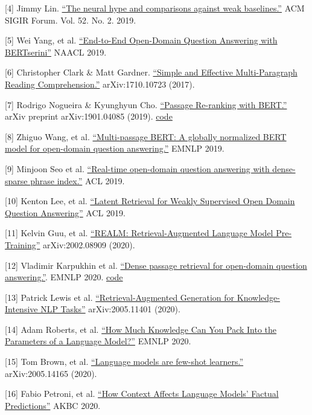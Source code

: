 {[}4{]} Jimmy Lin. \href{https://sigir.org/wp-content/uploads/2019/01/p040.pdf}{``The neural hype and comparisons against weak baselines.''} ACM SIGIR Forum. Vol. 52. No. 2. 2019.

{[}5{]} Wei Yang, et al. \href{https://arxiv.org/abs/1902.01718}{``End-to-End Open-Domain Question Answering with BERTserini''} NAACL 2019.

{[}6{]} Christopher Clark \& Matt Gardner. \href{https://arxiv.org/abs/1710.10723}{``Simple and Effective Multi-Paragraph Reading Comprehension.''} arXiv:1710.10723 (2017).

{[}7{]} Rodrigo Nogueira \& Kyunghyun Cho. \href{https://arxiv.org/abs/1901.04085}{``Passage Re-ranking with BERT.''} arXiv preprint arXiv:1901.04085 (2019). \textbar{} \href{https://github.com/nyu-dl/dl4marco-bert}{code}

{[}8{]} Zhiguo Wang, et al. \href{https://arxiv.org/abs/1908.08167}{``Multi-passage BERT: A globally normalized BERT model for open-domain question answering.''} EMNLP 2019.

{[}9{]} Minjoon Seo et al. \href{https://arxiv.org/abs/1906.05807}{``Real-time open-domain question answering with dense-sparse phrase index.''} ACL 2019.

{[}10{]} Kenton Lee, et al. \href{https://arxiv.org/abs/1906.00300}{``Latent Retrieval for Weakly Supervised Open Domain Question Answering''} ACL 2019.

{[}11{]} Kelvin Guu, et al. \href{https://arxiv.org/abs/2002.08909}{``REALM: Retrieval-Augmented Language Model Pre-Training''} arXiv:2002.08909 (2020).

{[}12{]} Vladimir Karpukhin et al. \href{https://arxiv.org/abs/2004.04906}{``Dense passage retrieval for open-domain question answering.''}. EMNLP 2020. \textbar{} \href{https://github.com/facebookresearch/DPR}{code}

{[}13{]} Patrick Lewis et al. \href{https://arxiv.org/abs/2005.11401}{``Retrieval-Augmented Generation for Knowledge-Intensive NLP Tasks''} arXiv:2005.11401 (2020).

{[}14{]} Adam Roberts, et al. \href{https://arxiv.org/abs/2002.08910}{``How Much Knowledge Can You Pack Into the Parameters of a Language Model?''} EMNLP 2020.

{[}15{]} Tom Brown, et al. \href{https://arxiv.org/abs/2005.14165}{``Language models are few-shot learners.''} arXiv:2005.14165 (2020).

{[}16{]} Fabio Petroni, et al. \href{https://arxiv.org/abs/2005.04611}{``How Context Affects Language Models' Factual Predictions''} AKBC 2020.

